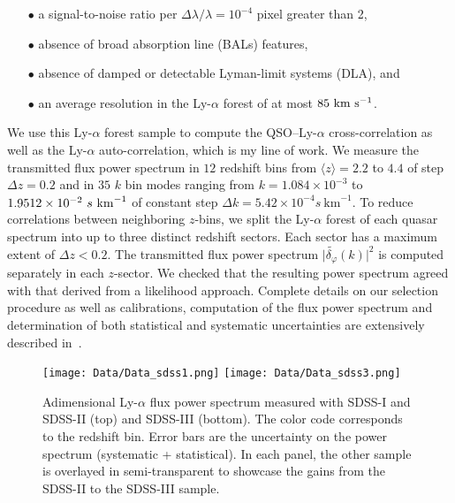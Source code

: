 \begin{itemize}
\item[$\bullet$] a signal-to-noise ratio per $\Delta \lambda / \lambda = 10^{-4}$ pixel greater than 2, \\
\item[$\bullet$] absence of broad absorption line (BALs) features, \\
\item[$\bullet$] absence of damped or detectable Lyman-limit systems (DLA), and \\
\item[$\bullet$] an average resolution in the Ly-$\alpha$ forest of at most $85~\rm{km}~s^{-1}$.\\
\end{itemize}

We use this Ly-$\alpha$ forest sample to compute the QSO--Ly-$\alpha$ cross-correlation as well as the Ly-$\alpha$ auto-correlation, which is my line of work. We measure the transmitted flux power spectrum in $12$ redshift bins from $\langle z \rangle = 2.2$ to $4.4$ of step $\Delta z = 0.2$ and in $35$ $k$ bin modes ranging from $k=1.084 \times 10^{-3}$ to $1.9512 \times 10^{-2}~s~\rm{km}^{-1}$ of constant step $\Delta k = 5.42 \times 10^{-4}s~\mathrm{km}^{-1}$. To reduce correlations between neighboring $z$-bins, we split the Ly-$\alpha$ forest of each quasar spectrum into up to three distinct redshift sectors. Each sector has a maximum extent of $\Delta z < 0.2$. The transmitted flux power spectrum $\vert \tilde{\delta_\varphi}(k) \vert^2$ is computed separately in each $z$-sector. We checked that the resulting power spectrum agreed with that derived from a likelihood approach. Complete details on our selection procedure as well as calibrations, computation of the flux power spectrum and  determination of both statistical and systematic uncertainties are extensively described in~\cite{Palanque-Delabrouille2013}. \\

\begin{figure}
\begin{center}
\texttt{[image: Data/Data\_sdss1.png]}
\texttt{[image: Data/Data\_sdss3.png]}
\caption{Adimensional Ly-$\alpha$ flux power spectrum measured with SDSS-I and SDSS-II (top) and SDSS-III (bottom). The color code corresponds to the redshift bin. Error bars are the uncertainty on the power spectrum (systematic + statistical). In each panel, the other sample is overlayed in semi-transparent to showcase the gains from the SDSS-II to the SDSS-III sample.}
\label{fig:sdss_before_after}
\end{center}
\end{figure}


